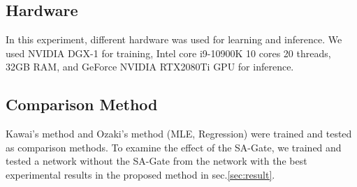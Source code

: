 

\subsection{Hardware}
In this experiment, different hardware was used for learning and inference. We used NVIDIA DGX-1 for training, Intel core i9-10900K 10 cores 20 threads, 32GB RAM, and GeForce NVIDIA RTX2080Ti GPU for inference.





\subsection{Comparison Method}
Kawai's method\cite{9708864} and Ozaki's method\cite{Ozaki_SII2021} (MLE, Regression) were trained and tested as comparison methods. To examine the effect of the SA-Gate, we trained and tested a network without the SA-Gate from the network with the best experimental results in the proposed method in sec.\ref{sec:result}.

